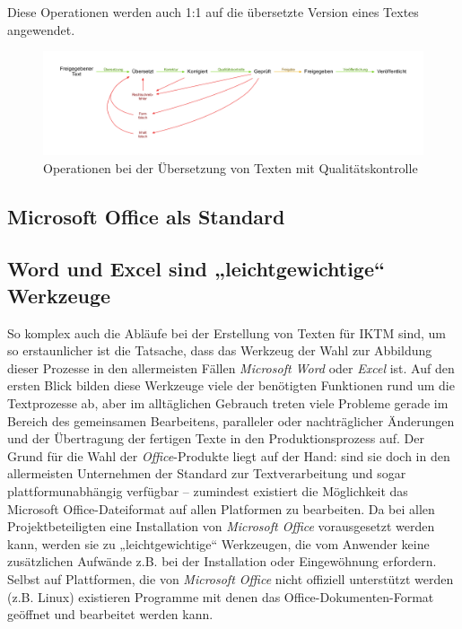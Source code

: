 Diese Operationen werden auch 1:1 auf die übersetzte Version eines Textes angewendet.

\begin{figure}[htb]
\begin{center}
\includegraphics[width=\textwidth]{media/chart-5.pdf}
\end{center}
\caption{Operationen bei der Übersetzung von Texten mit Qualitätskontrolle}
\label{chart:5}
\end{figure}

\subsection{Microsoft Office als Standard}

\subsection{Word und Excel sind „leichtgewichtige“ Werkzeuge}

So komplex auch die Abläufe bei der Erstellung von Texten für \ac{IKTM} sind, um so erstaunlicher ist die Tatsache, dass das Werkzeug der Wahl zur Abbildung dieser Prozesse in den allermeisten Fällen \emph{Microsoft Word} oder \emph{Excel} ist. Auf den ersten Blick bilden diese Werkzeuge viele der benötigten Funktionen rund um die Textprozesse ab, aber im alltäglichen Gebrauch treten viele Probleme gerade im Bereich des gemeinsamen Bearbeitens, paralleler oder nachträglicher Änderungen und der Übertragung der fertigen Texte in den Produktionsprozess auf. Der Grund für die Wahl der \emph{Office}-Produkte liegt auf der Hand: sind sie doch in den allermeisten Unternehmen der Standard zur Textverarbeitung und sogar plattformunabhängig verfügbar – zumindest existiert die Möglichkeit das Microsoft Office-Dateiformat auf allen Platformen zu bearbeiten. Da bei allen Projektbeteiligten eine Installation von \emph{Microsoft Office} vorausgesetzt werden kann, werden sie zu „leichtgewichtige“ Werkzeugen, die vom Anwender keine zusätzlichen Aufwände z.B. bei der Installation oder Eingewöhnung erfordern. Selbst auf Plattformen, die von \emph{Microsoft Office} nicht offiziell unterstützt werden (z.B. Linux) existieren Programme mit denen das Office-Dokumenten-Format geöffnet und bearbeitet werden kann.

